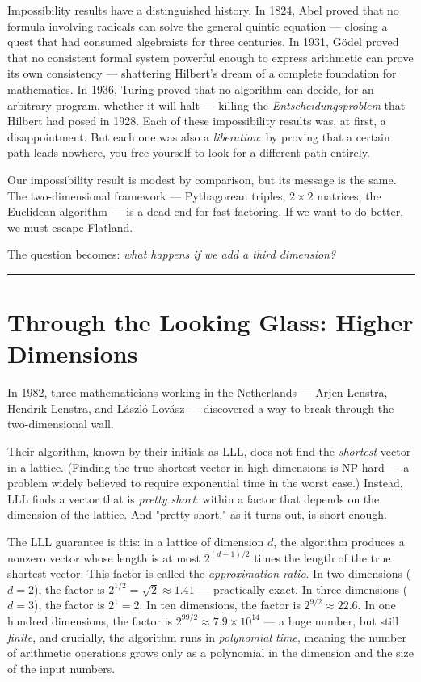 \documentclass[11pt,openany]{book}
\theoremstyle{definition}
\theoremstyle{plain}
\theoremstyle{remark}
\begin{document}
Impossibility results have a distinguished history. In 1824, Abel proved that no formula involving radicals can solve the general quintic equation — closing a quest that had consumed algebraists for three centuries. In 1931, Gödel proved that no consistent formal system powerful enough to express arithmetic can prove its own consistency — shattering Hilbert's dream of a complete foundation for mathematics. In 1936, Turing proved that no algorithm can decide, for an arbitrary program, whether it will halt — killing the \textit{Entscheidungsproblem} that Hilbert had posed in 1928. Each of these impossibility results was, at first, a disappointment. But each one was also a \textit{liberation}: by proving that a certain path leads nowhere, you free yourself to look for a different path entirely.

Our impossibility result is modest by comparison, but its message is the same. The two-dimensional framework — Pythagorean triples, $2 \times 2$ matrices, the Euclidean algorithm — is a dead end for fast factoring. If we want to do better, we must escape Flatland.

The question becomes: \textit{what happens if we add a third dimension?}

\bigskip\noindent\rule{\textwidth}{0.4pt}\bigskip


\section*{Through the Looking Glass: Higher Dimensions}


In 1982, three mathematicians working in the Netherlands — Arjen Lenstra, Hendrik Lenstra, and László Lovász — discovered a way to break through the two-dimensional wall.

Their algorithm, known by their initials as LLL, does not find the \textit{shortest} vector in a lattice. (Finding the true shortest vector in high dimensions is NP-hard — a problem widely believed to require exponential time in the worst case.) Instead, LLL finds a vector that is \textit{pretty short}: within a factor that depends on the dimension of the lattice. And "pretty short," as it turns out, is short enough.

The LLL guarantee is this: in a lattice of dimension $d$, the algorithm produces a nonzero vector whose length is at most $2^{(d-1)/2}$ times the length of the true shortest vector. This factor is called the \textit{approximation ratio}. In two dimensions ($d = 2$), the factor is $2^{1/2} = \sqrt{2} \approx 1.41$ — practically exact. In three dimensions ($d = 3$), the factor is $2^1 = 2$. In ten dimensions, the factor is $2^{9/2} \approx 22.6$. In one hundred dimensions, the factor is $2^{99/2} \approx 7.9 \times 10^{14}$ — a huge number, but still \textit{finite}, and crucially, the algorithm runs in \textit{polynomial time}, meaning the number of arithmetic operations grows only as a polynomial in the dimension and the size of the input numbers.
\end{document}
